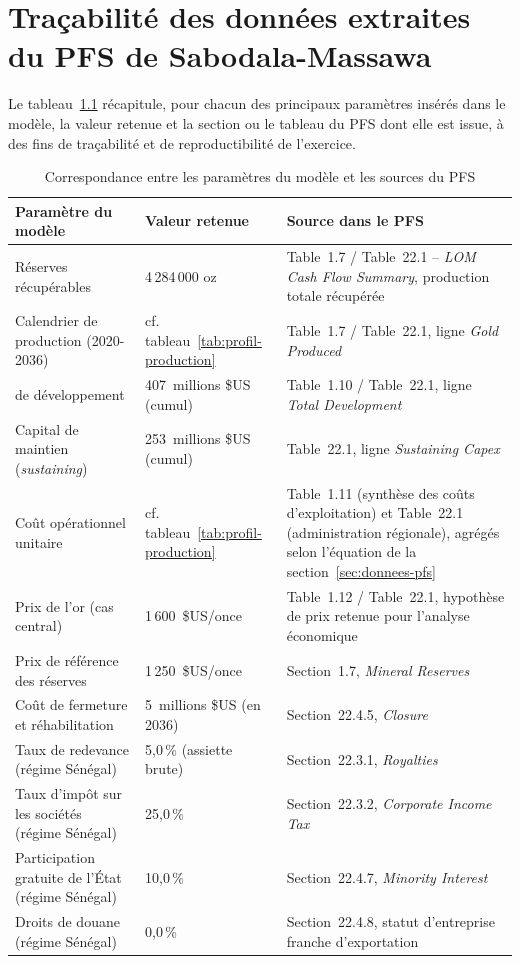 \chapter{Traçabilité des données extraites du PFS de Sabodala-Massawa}
\label{annexe:b}

Le tableau~\ref{tab:tracabilite} récapitule, pour chacun des principaux paramètres insérés dans le modèle, la valeur retenue et la section ou le tableau du PFS \citep{lycopodium2020pfs} dont elle est issue, à des fins de traçabilité et de reproductibilité de l'exercice.

\begin{table}[H]
\centering
\caption{Correspondance entre les paramètres du modèle et les sources du PFS}
\label{tab:tracabilite}
\footnotesize
\begin{tabular}{p{4.3cm}p{2.6cm}p{6.8cm}}
\toprule
Paramètre du modèle & Valeur retenue & Source dans le PFS \\
\midrule
Réserves récupérables & 4\,284\,000 oz & Table~1.7 / Table~22.1 -- \emph{LOM Cash Flow Summary}, production totale récupérée \\
Calendrier de production (2020-2036) & cf. tableau~\ref{tab:profil-production} & Table~1.7 / Table~22.1, ligne \emph{Gold Produced} \\
\CAPEX{} de développement & 407~millions \$US (cumul) & Table~1.10 / Table~22.1, ligne \emph{Total Development} \\
Capital de maintien (\emph{sustaining}) & 253~millions \$US (cumul) & Table~22.1, ligne \emph{Sustaining Capex} \\
Coût opérationnel unitaire & cf. tableau~\ref{tab:profil-production} & Table~1.11 (synthèse des coûts d'exploitation) et Table~22.1 (administration régionale), agrégés selon l'équation de la section~\ref{sec:donnees-pfs} \\
Prix de l'or (cas central) & 1\,600~\$US/once & Table~1.12 / Table~22.1, hypothèse de prix retenue pour l'analyse économique \\
Prix de référence des réserves & 1\,250~\$US/once & Section~1.7, \emph{Mineral Reserves} \\
Coût de fermeture et réhabilitation & 5~millions \$US (en 2036) & Section~22.4.5, \emph{Closure} \\
Taux de redevance (régime Sénégal) & 5,0\,\% (assiette brute) & Section~22.3.1, \emph{Royalties} \\
Taux d'impôt sur les sociétés (régime Sénégal) & 25,0\,\% & Section~22.3.2, \emph{Corporate Income Tax} \\
Participation gratuite de l'État (régime Sénégal) & 10,0\,\% & Section~22.4.7, \emph{Minority Interest} \\
Droits de douane (régime Sénégal) & 0,0\,\% & Section~22.4.8, statut d'entreprise franche d'exportation \\
\bottomrule
\end{tabular}
\end{table}
